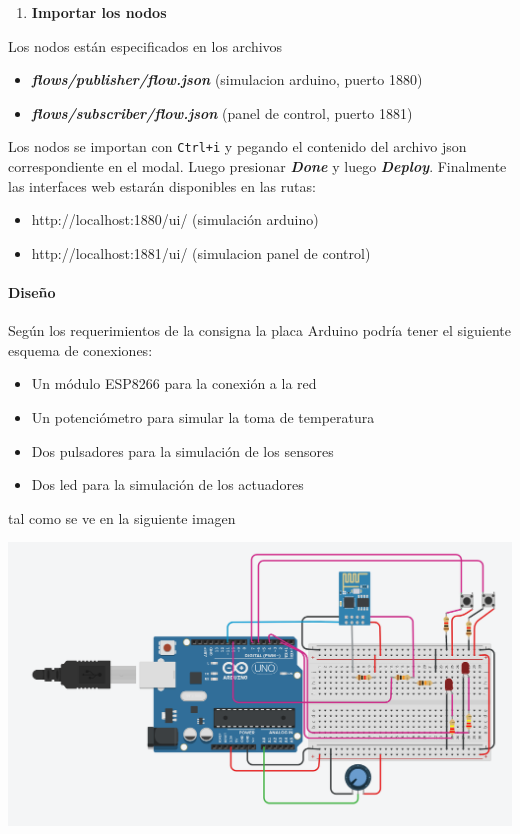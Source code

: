 \documentclass[11pt]{article}
\makeatletter
\def\maxwidth{\ifdim\Gin@nat@width>\linewidth\linewidth
    \else\Gin@nat@width\fi}
\let\Oldincludegraphics\includegraphics
\renewcommand{\includegraphics}[1]{\Oldincludegraphics[width=.8\maxwidth]{#1}}
\providecommand{\tightlist}{%
      \setlength{\itemsep}{0pt}\setlength{\parskip}{0pt}}
\makeatother
\begin{document}
\begin{enumerate}
\def\labelenumi{\arabic{enumi})}
\setcounter{enumi}{1}
\tightlist
\item
  \textbf{Importar los nodos}
\end{enumerate}

Los nodos están especificados en los archivos

\begin{itemize}
\item
  \textbf{\emph{flows/publisher/flow.json}} (simulacion arduino, puerto
  1880)
\item
  \textbf{\emph{flows/subscriber/flow.json}} (panel de control, puerto
  1881)
\end{itemize}

Los nodos se importan con \texttt{Ctrl+i} y pegando el contenido del
archivo json correspondiente en el modal. Luego presionar
\textbf{\emph{Done}} y luego \textbf{\emph{Deploy}}. Finalmente las
interfaces web estarán disponibles en las rutas:

\begin{itemize}
\item
  http://localhost:1880/ui/ (simulación arduino)
\item
  http://localhost:1881/ui/ (simulacion panel de control)
\end{itemize}

    \hypertarget{diseuxf1o}{%
\paragraph{Diseño}\label{diseuxf1o}}

Según los requerimientos de la consigna la placa Arduino podría tener el
siguiente esquema de conexiones:

\begin{itemize}
\item
  Un módulo ESP8266 para la conexión a la red
\item
  Un potenciómetro para simular la toma de temperatura
\item
  Dos pulsadores para la simulación de los sensores
\item
  Dos led para la simulación de los actuadores
\end{itemize}

tal como se ve en la siguiente imagen

    \includegraphics{images/placa.png}
\end{document}
